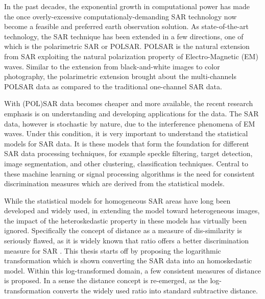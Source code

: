 


\begin{abstracts}        %

In the past decades, the exponential growth in computational power has made the once overly-excessive computationaly-demanding SAR technology now become a feasible and preferred earth observation solution.
As state-of-the-art technology, the SAR technique has been extended in a few directions, one of which is the polarimetric SAR or POLSAR.
POLSAR is the natural extension from SAR exploiting the natural polarization property of Electro-Magnetic (EM) waves.
Similar to the extension from black-and-white images to color photography, the polarimetric extension brought about the multi-channels POLSAR data as compared to the traditional one-channel SAR data.

With (POL)SAR data becomes cheaper and more available, the recent research emphasis is on understanding and developing applications for the data. %
The SAR data, however is stochastic by nature, due to the interference phenomena of EM waves. %
Under this condition, it is very important to understand the statistical models for SAR data.
It is these models that form the foundation for different SAR data processing techniques,
  for example speckle filtering, target detection, image segmentation, and other clustering, classification techniques.
Central to these machine learning or signal processing algorithms is the need for consistent discrimination measures which are derived from the statistical models.

While the statistical models for homogeneous SAR areas have long been developed and widely used,
  in extending the model toward heterogeneous images, the impact of the heteroskedastic property in these models has virtually been ignored.
Specifically the concept of distance as a measure of dis-similarity is seriously flawed,
  as it is widely known that ratio offers a better discrimination measure for SAR \cite{Rignot_1993_TGRS_896}.
This thesis starts off by proposing the logarithmic transformation which is shown converting the SAR data into an homoskedastic model.
Within this log-transformed domain, a few consistent measures of distance is proposed. 
In a sense the distance concept is re-emerged, as the log-transformation converts the widely used ratio into standard subtractive distance.


\end{abstracts}
